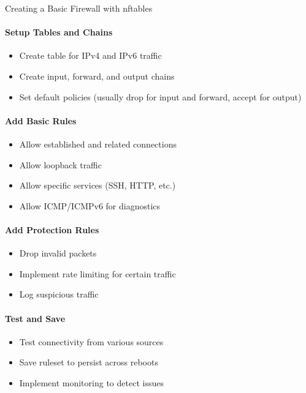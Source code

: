 \begin{KR}{Creating a Basic Firewall with nftables}\\
\paragraph{Setup Tables and Chains}
\begin{itemize}
    \item Create table for IPv4 and IPv6 traffic
    \item Create input, forward, and output chains
    \item Set default policies (usually drop for input and forward, accept for output)
\end{itemize}

\paragraph{Add Basic Rules}
\begin{itemize}
    \item Allow established and related connections
    \item Allow loopback traffic
    \item Allow specific services (SSH, HTTP, etc.)
    \item Allow ICMP/ICMPv6 for diagnostics
\end{itemize}

\paragraph{Add Protection Rules}
\begin{itemize}
    \item Drop invalid packets
    \item Implement rate limiting for certain traffic
    \item Log suspicious traffic
\end{itemize}

\paragraph{Test and Save}
\begin{itemize}
    \item Test connectivity from various sources
    \item Save ruleset to persist across reboots
    \item Implement monitoring to detect issues
\end{itemize}
\end{KR}

